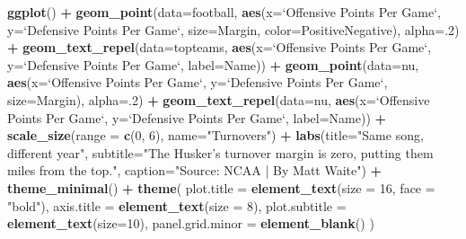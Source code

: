 \documentclass[]{book}
\newenvironment{Shaded}{\begin{snugshade}}{\end{snugshade}}
\newcommand{\DataTypeTok}[1]{\textcolor[rgb]{0.13,0.29,0.53}{#1}}
\newcommand{\DecValTok}[1]{\textcolor[rgb]{0.00,0.00,0.81}{#1}}
\newcommand{\KeywordTok}[1]{\textcolor[rgb]{0.13,0.29,0.53}{\textbf{#1}}}
\newcommand{\NormalTok}[1]{#1}
\newcommand{\OperatorTok}[1]{\textcolor[rgb]{0.81,0.36,0.00}{\textbf{#1}}}
\newcommand{\StringTok}[1]{\textcolor[rgb]{0.31,0.60,0.02}{#1}}
\begin{document}
\begin{Shaded}
\begin{Highlighting}[]
\KeywordTok{ggplot}\NormalTok{() }\OperatorTok{+}
\StringTok{  }\KeywordTok{geom_point}\NormalTok{(}\DataTypeTok{data=}\NormalTok{football, }\KeywordTok{aes}\NormalTok{(}\DataTypeTok{x=}\StringTok{`}\DataTypeTok{Offensive Points Per Game}\StringTok{`}\NormalTok{, }\DataTypeTok{y=}\StringTok{`}\DataTypeTok{Defensive Points Per Game}\StringTok{`}\NormalTok{, }\DataTypeTok{size=}\NormalTok{Margin, }\DataTypeTok{color=}\NormalTok{PositiveNegative), }\DataTypeTok{alpha=}\NormalTok{.}\DecValTok{2}\NormalTok{) }\OperatorTok{+}
\StringTok{  }\KeywordTok{geom_text_repel}\NormalTok{(}\DataTypeTok{data=}\NormalTok{topteams, }\KeywordTok{aes}\NormalTok{(}\DataTypeTok{x=}\StringTok{`}\DataTypeTok{Offensive Points Per Game}\StringTok{`}\NormalTok{, }\DataTypeTok{y=}\StringTok{`}\DataTypeTok{Defensive Points Per Game}\StringTok{`}\NormalTok{, }\DataTypeTok{label=}\NormalTok{Name)) }\OperatorTok{+}\StringTok{ }
\StringTok{  }\KeywordTok{geom_point}\NormalTok{(}\DataTypeTok{data=}\NormalTok{nu, }\KeywordTok{aes}\NormalTok{(}\DataTypeTok{x=}\StringTok{`}\DataTypeTok{Offensive Points Per Game}\StringTok{`}\NormalTok{, }\DataTypeTok{y=}\StringTok{`}\DataTypeTok{Defensive Points Per Game}\StringTok{`}\NormalTok{, }\DataTypeTok{size=}\NormalTok{Margin), }\DataTypeTok{alpha=}\NormalTok{.}\DecValTok{2}\NormalTok{) }\OperatorTok{+}
\StringTok{  }\KeywordTok{geom_text_repel}\NormalTok{(}\DataTypeTok{data=}\NormalTok{nu, }\KeywordTok{aes}\NormalTok{(}\DataTypeTok{x=}\StringTok{`}\DataTypeTok{Offensive Points Per Game}\StringTok{`}\NormalTok{, }\DataTypeTok{y=}\StringTok{`}\DataTypeTok{Defensive Points Per Game}\StringTok{`}\NormalTok{, }\DataTypeTok{label=}\NormalTok{Name)) }\OperatorTok{+}
\StringTok{  }\KeywordTok{scale_size}\NormalTok{(}\DataTypeTok{range =} \KeywordTok{c}\NormalTok{(}\DecValTok{0}\NormalTok{, }\DecValTok{6}\NormalTok{), }\DataTypeTok{name=}\StringTok{"Turnovers"}\NormalTok{) }\OperatorTok{+}
\StringTok{  }\KeywordTok{labs}\NormalTok{(}\DataTypeTok{title=}\StringTok{"Same song, different year"}\NormalTok{, }\DataTypeTok{subtitle=}\StringTok{"The Husker's turnover margin is zero, putting them miles from the top."}\NormalTok{, }\DataTypeTok{caption=}\StringTok{"Source: NCAA | By Matt Waite"}\NormalTok{)  }\OperatorTok{+}\StringTok{ }\KeywordTok{theme_minimal}\NormalTok{() }\OperatorTok{+}\StringTok{ }
\StringTok{  }\KeywordTok{theme}\NormalTok{(}
    \DataTypeTok{plot.title =} \KeywordTok{element_text}\NormalTok{(}\DataTypeTok{size =} \DecValTok{16}\NormalTok{, }\DataTypeTok{face =} \StringTok{"bold"}\NormalTok{),}
    \DataTypeTok{axis.title =} \KeywordTok{element_text}\NormalTok{(}\DataTypeTok{size =} \DecValTok{8}\NormalTok{), }
    \DataTypeTok{plot.subtitle =} \KeywordTok{element_text}\NormalTok{(}\DataTypeTok{size=}\DecValTok{10}\NormalTok{), }
    \DataTypeTok{panel.grid.minor =} \KeywordTok{element_blank}\NormalTok{()}
\NormalTok{    )}
\end{Highlighting}
\end{Shaded}
\end{document}
